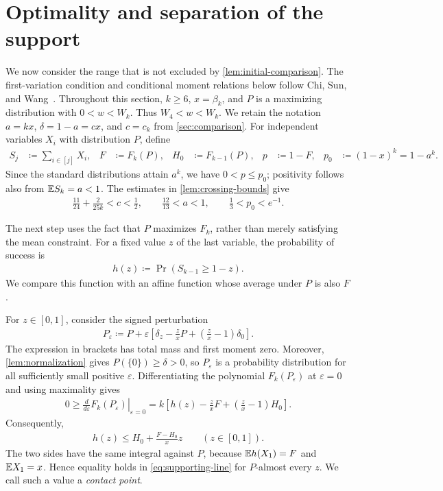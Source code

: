 \section{Optimality and separation of the support}\label{sec:support}

We now consider the range that is not excluded by \cref{lem:initial-comparison}. The first-variation condition and conditional moment relations below follow Chi, Sun, and Wang~\cite[Observation 4.1 and Corollary 4.2]{CSW2026}.
Throughout this section, $k\ge6$, $x=\beta_k$, and $P$ is a maximizing distribution with $0<w<W_k$.
Thus $W_4<w<W_k$.
We retain the notation $a=kx$, $\delta=1-a=cx$, and $c=c_k$ from \cref{sec:comparison}.
For independent variables $X_i$ with distribution $P$, define
\begin{align}
 S_j&\coloneqq\sum_{i\in[j]}X_i,
 &F&\coloneqq F_k(P),
 &H_0&\coloneqq F_{k-1}(P),
 &p&\coloneqq1-F,
 &p_0&\coloneqq(1-x)^k=1-a^k.
 \label{eq:optimal-parameters}
\end{align}
Since the standard distributions attain $a^k$, we have $0<p\le p_0$; positivity follows also from $\mathbb E S_k=a<1$.
The estimates in \cref{lem:crossing-bounds} give
\begin{align}
 \frac{11}{24}+\frac{2}{25k}<c<\frac12,
 \qquad \frac{12}{13}<a<1,
 \qquad \frac13<p_0<e^{-1}.
 \label{eq:critical-numerical-bounds}
\end{align}

The next step uses the fact that $P$ maximizes $F_k$, rather than merely satisfying the mean constraint.
For a fixed value $z$ of the last variable, the probability of success is
\begin{align*}
 h(z)\coloneqq\Pr(S_{k-1}\ge1-z).
\end{align*}
We compare this function with an affine function whose average under $P$ is also $F$.

For $z\in[0,1]$, consider the signed perturbation
\begin{align*}
 P_\varepsilon\coloneqq P+\varepsilon\left[\delta_z-\frac zxP+\left(\frac zx-1\right)\delta_0\right].
\end{align*}
The expression in brackets has total mass and first moment zero.
Moreover, \cref{lem:normalization} gives $P(\{0\})\ge\delta>0$, so $P_\varepsilon$ is a probability distribution for all sufficiently small positive $\varepsilon$.
Differentiating the polynomial $F_k(P_\varepsilon)$ at $\varepsilon=0$ and using maximality gives
\begin{align*}
 0\ge \left.\frac{d}{d\varepsilon}F_k(P_\varepsilon)\right|_{\varepsilon=0}
 =k\left[h(z)-\frac zxF+\left(\frac zx-1\right)H_0\right].
\end{align*}
Consequently,
\begin{align}
 h(z)\le H_0+\frac{F-H_0}{x}z
 \qquad(z\in[0,1]).
 \label{eq:supporting-line}
\end{align}
The two sides have the same integral against $P$, because $\mathbb E h(X_1)=F$ and $\mathbb E X_1=x$.
Hence equality holds in \cref{eq:supporting-line} for $P$-almost every $z$.
We call such a value a \emph{contact point}.

